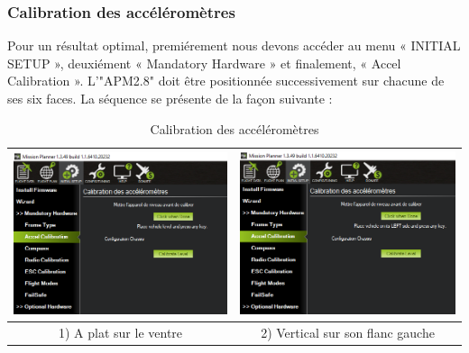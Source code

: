 	\subsubsection{Calibration des accéléromètres}
	Pour un résultat optimal,  premiérement nous devons accéder au menu « INITIAL SETUP », deuxiément « Mandatory Hardware » et finalement, « Accel Calibration ». L'"APM2.8" doit être positionnée successivement sur chacune de ses six faces.
	La séquence se présente de la façon suivante :
	
	\begin{table}[H]
		\begin{center}
			\caption{Calibration des accéléromètres  }
			
			\hspace*{-0.7 cm}	\begin{tabular}{|c|c|}
				\hline
				\centering
				\includegraphics[width=7.5cm]{Images/A plat sur le ventre} & \includegraphics[width=7.5cm]{Images/Vertical sur son flanc gauche}\\
				\hline
				\centering
				
				1) A plat sur le ventre & 2) Vertical sur son flanc gauche \\
				
				\hline
				

\end{tabular}
\end{center}
\end{table}
